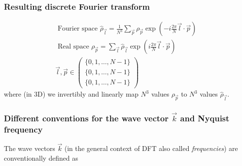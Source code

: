\subsubsection{Resulting discrete Fourier transform}
\begin{equation}
    \boxed{
    \begin{gathered}
    \text { Fourier space } \hat{\rho}_{\vec{l}}=\frac{1}{N^3} \sum_{\vec{p}} \rho_{\vec{p}} \exp \left(-i \frac{2 \pi}{N} \vec{l} \cdot \vec{p}\right) \\
    \text { Real space } \rho_{\vec{p}}=\sum_{\vec{l}} \hat{\rho}_{\vec{l}} \exp \left(i \frac{2 \pi}{N} \vec{l} \cdot \vec{p}\right) \\
    \vec{l}, \vec{p} \in\left(\begin{array}{l}
    \{0,1, \ldots, N-1\} \\
    \{0,1, \ldots, N-1\} \\
    \{0,1, \ldots, N-1\}
    \end{array}\right)
    \end{gathered}
    }
\end{equation}
where (in 3D) we invertibly and linearly map $N^3$ values $\rho_\vec{p}$ to $N^3$ values
$\hat{\rho}_{\vec{l}}$.


\subsubsection{Different conventions for the wave vector $\vec{k}$ and Nyquist frequency}
The wave vectors $\vec{k}$ (in the general context of DFT also called \textit{frequencies}) are conventionally
defined as

